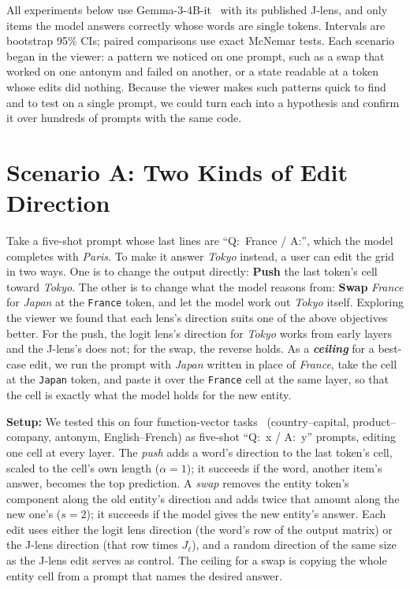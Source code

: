 \documentclass{vgtc}       %
\newcommand{\LL}{logit lens}
\newcommand{\JL}{J-lens}
\begin{document}
All experiments below use Gemma-3-4B-it~\cite{gemma3} with its published \JL, and only items the model answers
correctly whose words are single tokens. Intervals are bootstrap 95\% CIs; paired comparisons use exact McNemar tests.
Each scenario began in the viewer: a pattern we noticed on one prompt, such as a swap that worked on one antonym and
failed on another, or a state readable at a token whose edits did nothing. Because the viewer makes such patterns
quick to find and to test on a single prompt, we could turn each into a hypothesis and confirm it over hundreds of
prompts with the same code.

\section{Scenario A: Two Kinds of Edit Direction}
\label{sec:directions}

Take a five-shot prompt whose last lines are ``Q:~France / A:'', which the model completes with \emph{Paris}. To
make it answer \emph{Tokyo} instead, a user can edit the grid in two ways. One is to change the output directly:
\textbf{Push} the last token's cell toward \emph{Tokyo}. The other is to change what the model reasons from: \textbf{Swap}
\emph{France} for \emph{Japan} at the \texttt{France} token, and let the model work out \emph{Tokyo} itself. Exploring the viewer we found that each lens's direction suits
one of the above objectives better. For the push, the \LL's direction for \emph{Tokyo} works from early layers and the \JL's does not; for
the swap, the reverse holds. As a \textbf{\emph{ceiling}} for a best-case edit, we run the prompt with \emph{Japan} written in place of \emph{France}, take the cell at the
\texttt{Japan} token, and paste it over the \texttt{France} cell at the same layer, so that the cell is exactly what
the model holds for the new entity.

\textbf{Setup:} We tested this on four function-vector tasks~\cite{todd2024function} (country--capital,
product--company, antonym, English--French) as five-shot ``Q:~x / A:~y'' prompts, editing one cell at every layer. The \emph{push} adds a word's direction to the last
token's cell, scaled to the cell's own length ($\alpha=1$); it succeeds if the word, another item's answer, becomes the
top prediction. A \emph{swap} removes the entity token's component along the old entity's direction and adds twice
that amount along the new one's ($s=2$); it succeeds if the model gives the new entity's answer. Each edit uses either
the \LL{} direction (the word's row of the output matrix) or the \JL{} direction (that row times $J_\ell$), and a
random direction of the same size as the \JL{} edit serves as control. The ceiling for a swap is copying the whole
entity cell from a prompt that names the desired answer.
\end{document}

